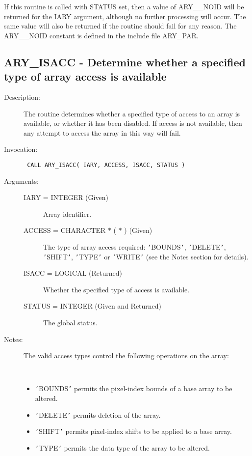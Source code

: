 \documentclass[twoside,11pt]{article}
\newcommand{\xlabel}[1]{}
\newlength{\sstbannerlength}
\newlength{\sstcaptionlength}
\newlength{\sstexampleslength}
\newlength{\sstexampleswidth}
\newcommand{\sstroutine}[3]{
   \goodbreak
   \rule{\textwidth}{0.5mm}
   \vspace{-7ex}
   \newline
   \settowidth{\sstbannerlength}{{\Large {\bf #1}}}
   \setlength{\sstcaptionlength}{\textwidth}
   \setlength{\sstexampleslength}{\textwidth}
   \addtolength{\sstbannerlength}{0.5em}
   \addtolength{\sstcaptionlength}{-2.0\sstbannerlength}
   \addtolength{\sstcaptionlength}{-5.0pt}
   \settowidth{\sstexampleswidth}{{\bf Examples:}}
   \addtolength{\sstexampleslength}{-\sstexampleswidth}
   \parbox[t]{\sstbannerlength}{\flushleft{\Large {\bf #1}}}
   \parbox[t]{\sstcaptionlength}{\center{\Large #2}}
   \parbox[t]{\sstbannerlength}{\flushright{\Large {\bf #1}}}
   \begin{description}
      #3
   \end{description}
}
\newcommand{\sstdescription}[1]{\item[Description:] #1}
\newcommand{\sstinvocation}[1]{\item[Invocation:]\hspace{0.4em}{\tt #1}}
\newcommand{\sstarguments}[1]{
   \item[Arguments:] \mbox{} \\
   \vspace{-3.5ex}
   \begin{description}
      #1
   \end{description}
}
\newcommand{\sstsubsection}[1]{ \item[{#1}] \mbox{} \\}
\newcommand{\sstnotes}[1]{\item[Notes:] \mbox{} \\[1.3ex] #1}
\newcommand{\sstitemlist}[1]{
  \mbox{} \\
  \vspace{-3.5ex}
  \begin{itemize}
     #1
  \end{itemize}
}
\newcommand{\sstitem}{\item}
\newcommand{\ssttt}{\tt}
\renewcommand{\sstroutine}[3]{
      \subsection{#1\xlabel{#1}-\label{#1}#2}
      \begin{description}
         #3
      \end{description}
   }
\renewcommand{\sstdescription}[1]{\item[Description:]
      \begin{description}
         #1
      \end{description}
   }
\renewcommand{\sstinvocation}[1]{\item[Invocation:]
      \begin{description}
         {\ssttt #1}
      \end{description}
   }
\renewcommand{\sstarguments}[1]{
      \item[Arguments:]
      \begin{description}
         #1
      \end{description}
   }
\renewcommand{\sstsubsection}[1]{\item[{#1}]}
\renewcommand{\sstnotes}[1]{\item[Notes:]
      \begin{description}
         #1
      \end{description}
   }
\newcommand{\sstitemlist}[1]{
      \begin{itemize}
         #1
      \end{itemize}
   }
\begin{document}
\begin{eqn*}
{{{         \sstitem
         If this routine is called with STATUS set, then a value of
         ARY\_\_NOID will be returned for the IARY argument, although no
         further processing will occur. The same value will also be
         returned if the routine should fail for any reason. The ARY\_\_NOID
         constant is defined in the include file ARY\_PAR.
      }
   }
}
\sstroutine{
   ARY\_ISACC
}{
   Determine whether a specified type of array access is available
}{
   \sstdescription{
      The routine determines whether a specified type of access to an
      array is available, or whether it has been disabled. If access is
      not available, then any attempt to access the array in this way
      will fail.
   }
   \sstinvocation{
      CALL ARY\_ISACC( IARY, ACCESS, ISACC, STATUS )
   }
   \sstarguments{
      \sstsubsection{
         IARY = INTEGER (Given)
      }{
         Array identifier.
      }
      \sstsubsection{
         ACCESS = CHARACTER $*$ ( $*$ ) (Given)
      }{
         The type of array access required: {\tt '}BOUNDS{\tt '}, {\tt '}DELETE{\tt '},
         {\tt '}SHIFT{\tt '}, {\tt '}TYPE{\tt '} or {\tt '}WRITE{\tt '} (see the Notes section for
         details).
      }
      \sstsubsection{
         ISACC = LOGICAL (Returned)
      }{
         Whether the specified type of access is available.
      }
      \sstsubsection{
         STATUS = INTEGER (Given and Returned)
      }{
         The global status.
      }
   }
   \sstnotes{
      The valid access types control the following operations on the
      array:
      \sstitemlist{

         \sstitem
         {\tt '}BOUNDS{\tt '} permits the pixel-index bounds of a base array to be
         altered.

         \sstitem
         {\tt '}DELETE{\tt '} permits deletion of the array.

         \sstitem
         {\tt '}SHIFT{\tt '} permits pixel-index shifts to be applied to a base
         array.

         \sstitem
         {\tt '}TYPE{\tt '} permits the data type of the array to be altered.

}}}
\end{eqn*}
\end{document}
